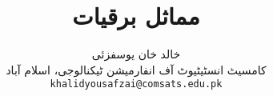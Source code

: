 \documentclass[leqno,b5paper]{book}
\author{
خالد خان یوسفزئی\\
{\small {کامسیٹ انسٹیٹیوٹ آف انفارمیشن ٹیکنالوجی، اسلام آباد}}\\
\texttt{khalidyousafzai@comsats.edu.pk}
}
\title{مماثل برقیات}
\date{}                           %
\begin{document}
\begin{urdufont}

\renewcommand*{\contentsname}{عنوان}    %

\frontmatter                          %

\maketitle

\tableofcontents
\pagestyle{empty}




\mainmatter                      %

\pagestyle{headings}












%
%
%
%
%
%


\backmatter

\renewcommand*{\indexname}{فرہنگ}      %
\cleardoublepage
{}
\printindex


\end{urdufont}
\end{document}
